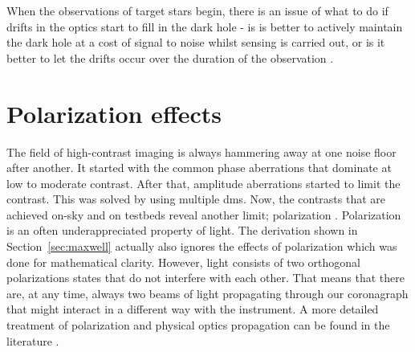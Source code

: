 \documentclass[letterpaper]{ar-1col}
\begin{document}
When the observations of target stars begin, there is an issue of what to do if drifts in the optics start to fill in the dark hole - is is better to actively maintain the dark hole at a cost of signal to noise whilst sensing is carried out, or is it better to let the drifts occur over the duration of the observation \citep{Pogorelyuk19,Redmond20}.

\section{Polarization effects} 

The field of high-contrast imaging is always hammering away at one noise floor after another.
%
It started with the common phase aberrations that dominate at low to moderate contrast.
%
After that, amplitude aberrations started to limit the contrast. This was solved by using multiple \acp{dm}.
%
Now, the contrasts that are achieved on-sky and on testbeds reveal another limit; polarization \citep{Schmid18,millar2022polarization,vanHolstein23, baudoz2024polarization}.
%
Polarization is an often underappreciated property of light.
%
The derivation shown in Section~\ref{sec:maxwell} actually also ignores the effects of polarization which was done for mathematical clarity.
%
However, light consists of two orthogonal polarizations states that do not interfere with each other.
%
That means that there are, at any time, always two beams of light propagating through our coronagraph that might interact in a different way with the instrument.
%
A more detailed treatment of polarization and physical optics propagation can be found in the literature \citep{McLeod14}.
\end{document}
